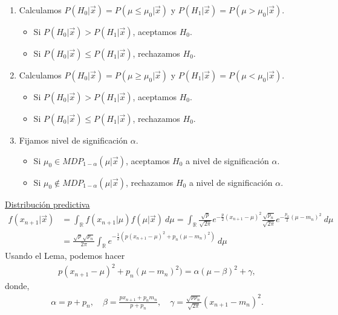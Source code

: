 \begin{enumerate}
    \item Calculamos $P(H_0 | \vec{x}) = P(\mu\leq \mu_0 |\vec{x})$ y $P(H_1 | \vec{x}) = P(\mu> \mu_0 | \vec{x})$.
    \begin{itemize}
        \item Si $P(H_0 | \vec{x}) > P(H_1 | \vec{x})$, aceptamos $H_0$.
        \item Si $P(H_0 | \vec{x}) \leq P(H_1 | \vec{x})$, rechazamos $H_0$.
    \end{itemize}
        \item Calculamos $P(H_0 | \vec{x}) = P(\mu \ge \mu_0 |\vec{x})$ y $P(H_1 | \vec{x}) = P(\mu < \mu_0 | \vec{x})$.
    \begin{itemize}
        \item Si $P(H_0 | \vec{x}) > P(H_1 | \vec{x})$, aceptamos $H_0$.
        \item Si $P(H_0 | \vec{x}) \leq P(H_1 | \vec{x})$, rechazamos $H_0$.
    \end{itemize}
    \item Fijamos nivel de significación $\alpha$.
    \begin{itemize}
        \item Si $\mu_0 \in MDP_{1 - \alpha}(\mu | \vec{x})$, aceptamos $H_0$ a nivel de significación $\alpha$.
        \item Si $\mu_0 \not\in MDP_{1 - \alpha}(\mu| \vec{x})$, rechazamos $H_0$ a nivel de significación $\alpha$.
    \end{itemize}
\end{enumerate}
\noindent \underline{Distribución predictiva}
\begin{align*}
    f(x_{n+1} | \vec{x}) &= \int_{\mathbb{R}} f(x_{n+1} | \mu) f(\mu | \vec{x}) \ d\mu = \int_{\mathbb{R}} \frac{\sqrt{p}}{\sqrt{2\pi}}e^{-\frac{p}{2}(x_{n+1} - \mu)^2} \frac{\sqrt{p_n}}{\sqrt{2\pi}} e^{-\frac{p_n}{2}(\mu - m_n)^2} \ d\mu \\
    &= \frac{\sqrt{p}\sqrt{p_n}}{2\pi} \int_{\mathbb{R}} e^{-\frac{1}{2}(p(x_{n+1} - \mu)^2 + p_n(\mu - m_n)^2)} \ d\mu
\end{align*}
Usando el Lema, podemos hacer
\begin{align*}
    p(x_{n+1} - \mu)^2 + p_n(\mu - m_n)^2) = \alpha(\mu- \beta)^2 + \gamma,
\end{align*}
donde,
\begin{align*}
    \alpha = p + p_n, \quad \beta = \frac{px_{n+1} + p_nm_n}{p+p_n}, \quad \gamma = \frac{\sqrt{pp_n}}{\sqrt{2\pi}}(x_{n+1} - m_n)^2.
\end{align*}
